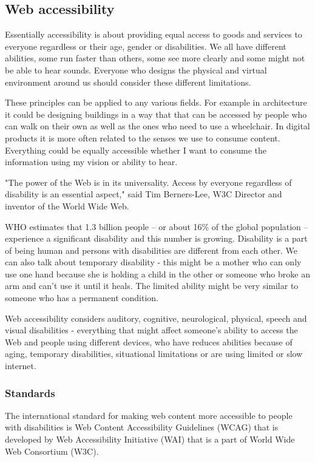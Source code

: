 \documentclass{master_thesis}
\begin{document}
\subsection{Web accessibility}

Essentially accessibility is about providing equal access to goods and services to everyone regardless or their age, gender or disabilities. We all have different abilities, some run faster than others, some see more clearly and some might not be able to hear sounds. Everyone who designs the physical and virtual environment around us should consider these different limitations.

These principles can be applied to any various fields. For example in architecture it could be designing buildings in a way that that can be accessed by people who can walk on their own as well as the ones who need to use a wheelchair. In digital products it is more often related to the senses we use to consume content. Everything could be equally accessible whether I want to consume the information  using my vision or ability to hear.

"The power of the Web is in its universality. Access by everyone regardless of disability is an essential aspect," said Tim Berners-Lee, W3C Director and inventor of the World Wide Web\citep{WWWC1997}.

WHO estimates that 1.3 billion people – or about 16\% of the global population – experience a significant disability and this number is growing. Disability is a part of being human and persons with disabilities are different from each other. \citep{WHO2022} We can also talk about temporary disability - this might be a mother who can only use one hand because she is holding a child in the other or someone who broke an arm and can't use it until it heals. The limited ability might be very similar to someone who has a permanent condition.

Web accessibility considers auditory, cognitive, neurological, physical, speech and visual  disabilities - everything that might affect someone's ability to access the Web and people using different devices, who have reduces abilities because of aging, temporary disabilities, situational limitations or are using limited or slow internet. \citep{Henry2022}

\subsubsection{Standards}

The international standard for making web content more accessible to people with disabilities is Web Content Accessibility Guidelines (WCAG) that is developed by Web Accessibility Initiative (WAI) that is a part of World Wide Web Consortium (W3C).
\end{document}
